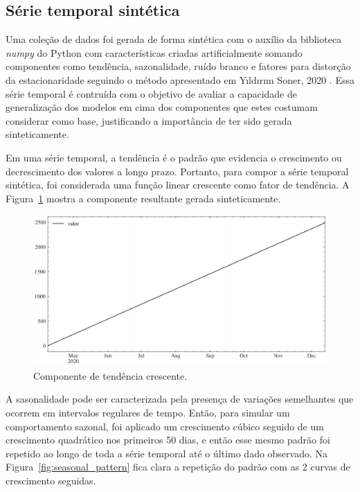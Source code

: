 \FloatBarrier

\subsection{Série temporal sintética}
Uma coleção de dados foi gerada de forma sintética com o auxílio da biblioteca \textit{numpy} do Python com características criadas artificialmente somando componentes como tendência, sazonalidade, ruído branco e fatores para distorção da estacionaridade seguindo o método apresentado em Yıldırım Soner, 2020 \cite{syntheticdata}. Essa série temporal é contruída com o objetivo de avaliar a capacidade de generalização dos modelos em cima dos componentes que estes costumam considerar como base, justificando a importância de ter sido gerada sinteticamente.

Em uma série temporal, a tendência é o padrão que evidencia o crescimento ou decrescimento dos valores a longo prazo. Portanto, para compor a série temporal sintética, foi considerada uma função linear crescente como fator de tendência. A Figura~\ref{fig:upward_trend} mostra a componente resultante gerada sinteticamente.

\begin{figure}[!htp]
    \centering
    \includegraphics[width=5.0in]{img/upward_trend.pdf}
    \caption{Componente de tendência crescente.}
    \label{fig:upward_trend}
\end{figure}

A sasonalidade pode ser caracterizada pela presença de variações semelhantes que ocorrem em intervalos regulares de tempo. Então, para simular um comportamento sazonal, foi aplicado um crescimento cúbico seguido de um crescimento quadrático nos primeiros 50 dias, e então esse mesmo padrão foi repetido ao longo de toda a série temporal até o último dado observado. Na Figura~\ref{fig:seasonal_pattern} fica clara a repetição do padrão com as 2 curvas de crescimento seguidas.

